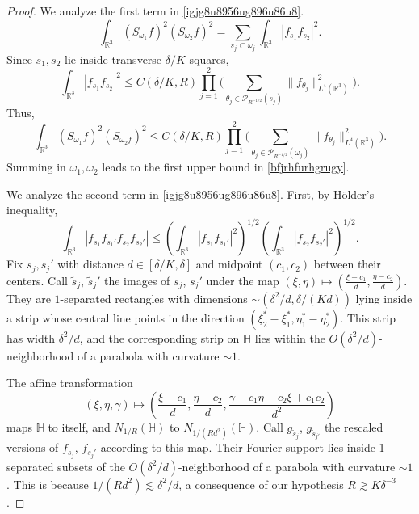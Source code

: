\documentclass{amsart}%
\numberwithin{equation}{section}
\newcommand{\cP}{\mathcal P}
\newcommand{\ZH}{\mathbb{H}}
\newcommand{\R}{\mathbb{R}}
\newcommand{\1}{\mathbbm{1}}
\begin{document}
\begin{proof}
	 We analyze the first term in \eqref{igjg8u8956ug896u86u8}.
		$$\int_{\R^3}(S_{\omega_1}f)^2(S_{\omega_2}f)^2=\sum_{s_j\subset \omega_j}\int_{\R^3}|f_{s_1}f_{s_2}|^2.$$
		Since $s_1,s_2$ lie inside transverse  $\delta/K$-squares, 
		$$\int_{\R^3}|f_{s_1}f_{s_2}|^2\le C(\delta/K,R)\prod_{j=1}^2\Big(\sum_{\theta_j\in \cP_{R^{-1/2}}(s_j)}\big\|f_{\theta_j}\big\|_{L^4(\R^3)}^2\Big).$$
		Thus,
		$$\int_{\R^3}(S_{\omega_1}f)^2(S_{\omega_2f})^2\le C(\delta/K,R)\prod_{j=1}^2\Big(\sum_{\theta_j\in \cP_{R^{-1/2}}(\omega_j)}\big\|f_{\theta_j}\big\|_{L^4(\R^3)}^2\Big).$$
		Summing in $\omega_1,\omega_2$ leads to the first upper bound in \eqref{bfjrhfurhgrugy}.
	\bigskip
		
	 We analyze the second term in \eqref{igjg8u8956ug896u86u8}. First, by H\"older's inequality,
		$$\int_{\R^3} |f_{s_1}f_{s_1'}f_{s_2}f_{s_2'}|\le (\int_{\R^3} |f_{s_1}f_{s_1'}|^2)^{1/2}(\int_{\R^3}|f_{s_2}f_{s_2'}|^2)^{1/2}.$$
		Fix $s_j,s_j'$ with distance $d\in[\delta/K,\delta]$ and midpoint $(c_1,c_2)$ between their centers.
		Call $\tilde{s}_j$, $\tilde{s}_j'$ the images of $s_j$, $s_{j}'$ under the map $(\xi,\eta)\mapsto(\frac{\xi-c_1}{d},\frac{\eta-c_2}{d})$. They are $1$-separated rectangles with dimensions $\sim (\delta^2/d,\delta/(Kd))$ lying inside a strip
		whose central line points in the direction  $(\xi_2^*-\xi_1^*,\eta_1^*-\eta_2^*)$. This strip has width $\delta^2/d$, and the corresponding strip on $\ZH$ lies within the $O(\delta^2/d)$-neighborhood of a parabola with curvature $\sim 1$.
		
		
		
		
		The affine transformation
		$$(\xi,\eta, \gamma)\mapsto (\frac{\xi-c_1}{d},\frac{\eta-c_2}{d},\frac{\gamma-c_1\eta-c_2\xi+c_1c_2}{d^2})$$
		maps $\ZH$ to itself, and $N_{1/R}(\ZH)$ to $N_{1/(Rd^2)}(\ZH)$. Call $g_{\tilde{s}_j}$, $g_{\tilde{s}_{j'}}$  the rescaled versions of $f_{s_j}$, $f_{s_j'}$	according to this map. Their Fourier support lies inside 1-separated subsets of the $O(\delta^2/d)$-neighborhood of a parabola with curvature $\sim 1$. This is because $1/(Rd^2)\lesssim \delta^2/d$, a consequence of our hypothesis $R\gtrsim K\delta^{-3}$. 
		

\end{proof}
\end{document}
